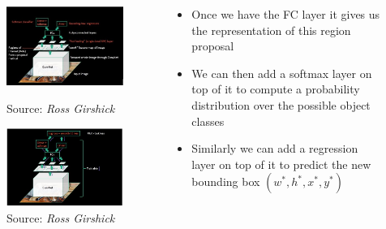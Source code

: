 \begin{frame}
\begin{columns}
\begin{overlayarea}{\textwidth}{\textheight}
\begin{figure}[h!]
\begin{overprint}
					\centering\includegraphics[scale= 0.45]{images/43}\caption[Caption]{\hspace{-90pt} Source: \it{Ross Girshick}}
					\centering\includegraphics[scale= 0.45]{images/44}\caption[Caption]{\hspace{-90pt} Source: \it{Ross Girshick}}
				\end{overprint} 
			\end{figure}
		\end{overlayarea}     
		\begin{overlayarea}{\textwidth}{\textheight}
              
			\begin{itemize}
				\justifying
				\item<1-> Once we have the FC layer it gives us the representation of this region proposal
				\item<2-> We can then add a softmax layer on top of it to compute a probability distribution over the possible object classes
				\item<3-> Similarly we can add a regression layer on top of it to predict the new bounding box $(w^*, h^*, x^*, y^*)$
			\end{itemize}
		\end{overlayarea}
	\end{columns}              
	
\end{frame}

